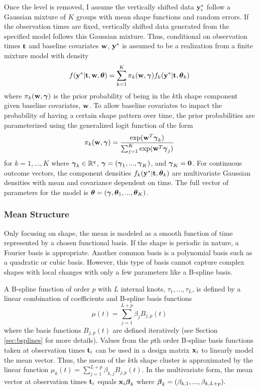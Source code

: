 Once the level is removed, I assume the vertically shifted data $\mathbf y_{i}^{*}$ follow a Gaussian mixture of $K$ groups with mean shape functions and random errors. If the observation times are fixed, vertically shifted data generated from the specified model follows this Gaussian mixture. Thus, conditional on observation times $\mathbf t$ and baseline covariates $\mathbf w$, $\mathbf y^{*}$ is assumed to be a realization from a finite mixture model with density
\begin{align*}
 f(\mathbf y^{*}|\mathbf t,\mathbf w,\boldsymbol\theta) =  \sum^{K}_{k=1}\pi_{k}(\mathbf w,\boldsymbol \gamma)f_{k}( \mathbf y^{*}|\mathbf t,\boldsymbol\theta_{k})
\end{align*}
where $\pi_{k}(\mathbf w,\boldsymbol \gamma)$ is the prior probability of being in the $k$th shape component given baseline covariates, $\mathbf w$. To allow baseline covariates to impact the probability of having a certain shape pattern over time, the prior probabilities are parameterized using the generalized logit function of the form
$$\pi_{k}(\mathbf w,\boldsymbol\gamma)=\frac{\exp(\mathbf w^{T}\boldsymbol\gamma_{k})}{\sum_{j=1}^{K}\exp(\mathbf w^{T}\boldsymbol\gamma_{j})}$$ 
for $k=1,...,K$ where $\boldsymbol \gamma_{k}\in\mathbb{R}^{q}$, $\boldsymbol\gamma = (\boldsymbol\gamma_{1},...,\boldsymbol\gamma_{K})$, and $\boldsymbol\gamma_{K}=\mathbf 0$. For continuous outcome vectors, the component densities $f_{k}(\mathbf y^{*}|\mathbf t,\boldsymbol\theta_{k})$ are multivariate Gaussian densities with mean and covariance dependent  on time. The full vector of parameters for the model is $\boldsymbol\theta = (\boldsymbol\gamma,\boldsymbol\theta_{1},...,\boldsymbol\theta_{K})$. 

\subsubsection{Mean Structure}
Only focusing on shape, the mean is modeled as a smooth function of time represented by a chosen functional basis. If the shape is periodic in nature, a Fourier basis is appropriate. Another common basis is a polynomial basis such as a quadratic or cubic basis. However, this type of basis cannot capture complex shapes with local changes with only a few parameters like a B-spline basis.

A B-spline function of order $p$ with $L$ internal knots, $\tau_{1},...,\tau_{L}$, is defined by a linear combination of coefficients and B-spline basis functions
$$\mu(t) = \sum^{L+p}_{j=1} \beta_j B_{j,p}(t)$$
where the basis functions $B_{j,p}(t)$ are defined iteratively \cite{deboor1972,cox1972}  (see Section \ref{sec:bsplines} for more details). Values from the $p$th order B-spline basis functions taken at observation times $\mathbf t_{i}$ can be used in a design matrix $\mathbf x_{i}$ to linearly model the mean vector. Thus, the mean of the $k$th shape cluster is approximated by the linear function $\mu_{k}(t) = \sum^{L+p}_{j=1} \beta_{k,j} B_{j,p}(t)$. In the multivariate form, the mean vector at observation times $\mathbf t_{i}$ equals $\mathbf x_{i}\boldsymbol\beta_{k}$ where $\boldsymbol\beta_{k}=(\beta_{k,1},...,\beta_{k, L+p}).$  

